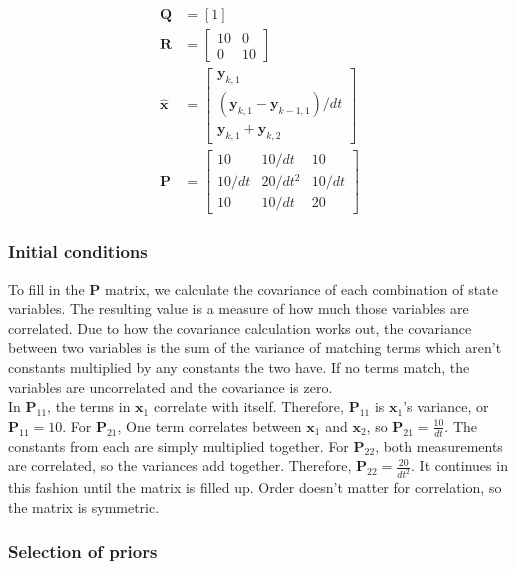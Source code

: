 \documentclass[10pt,conference,compsoc]{IEEEtran}
\newcommand{\mtx}[1] {\bm #1}
\begin{document}
\begin{align}
  \mtx{Q} &= \left[1\right] \\
  \mtx{R} &= \left[
  \begin{array}{cc}
    10 & 0 \\
    0 & 10
  \end{array} \right] \\
  \hat{\mtx{x}} &= \left[
  \begin{array}{c}
    \mtx{y}_{k,1} \\
    (\mtx{y}_{k,1} - \mtx{y}_{k-1,1})/dt \\
    \mtx{y}_{k,1} + \mtx{y}_{k,2}
  \end{array} \right] \\
  \mtx{P} &= \left[
  \begin{array}{ccc}
    10 & 10/dt & 10 \\
    10/dt & 20/dt^2 & 10/dt \\
    10 & 10/dt & 20
  \end{array} \right]
\end{align}

\subsubsection{Initial conditions}

To fill in the $\mtx{P}$ matrix, we calculate the covariance of each combination
of state variables. The resulting value is a measure of how much those variables
are correlated. Due to how the covariance calculation works out, the covariance
between two variables is the sum of the variance of matching terms which aren't
constants multiplied by any constants the two have. If no terms match, the
variables are uncorrelated and the covariance is zero. \\

In $\mtx{P}_{11}$, the terms in $\mtx{x}_1$ correlate with itself. Therefore,
$\mtx{P}_{11}$ is $\mtx{x}_1$'s variance, or $\mtx{P}_{11} = 10$. For
$\mtx{P}_{21}$, One term correlates between $\mtx{x}_1$ and $\mtx{x}_2$, so
$\mtx{P}_{21} = \frac{10}{dt}$. The constants from each are simply multiplied
together. For $\mtx{P}_{22}$, both measurements are correlated, so the variances
add together. Therefore, $\mtx{P}_{22} = \frac{20}{dt^2}$. It continues in this
fashion until the matrix is filled up. Order doesn't matter for correlation, so
the matrix is symmetric.

\subsubsection{Selection of priors}
\end{document}
